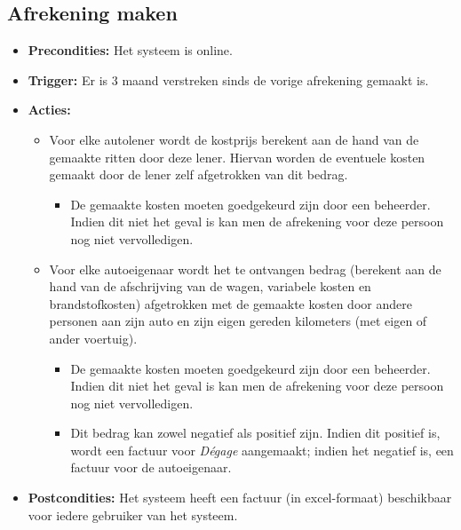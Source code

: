 \documentclass[]{article}
\begin{document}
\subsection{Afrekening maken}
\begin{itemize}
\item \textbf{Precondities:} Het systeem is online.
\item \textbf{Trigger:} Er is 3 maand verstreken sinds de vorige afrekening gemaakt is.
\item \textbf{Acties:} 
\begin{itemize}
	\item	Voor elke autolener wordt de kostprijs berekent aan de hand van de gemaakte ritten door deze lener. Hiervan worden de eventuele kosten gemaakt door de lener zelf afgetrokken van dit bedrag.
		\begin{itemize}
			\item De gemaakte kosten moeten goedgekeurd zijn door een beheerder. Indien dit niet het geval is kan men de afrekening voor deze persoon nog niet vervolledigen.
		\end{itemize}
	\item	Voor elke autoeigenaar wordt het te ontvangen bedrag (berekent aan de hand van de afschrijving van de wagen, variabele kosten en brandstofkosten) afgetrokken met de gemaakte kosten door andere personen aan zijn auto en zijn eigen gereden kilometers (met eigen of ander voertuig).
		\begin{itemize}
			\item De gemaakte kosten moeten goedgekeurd zijn door een beheerder. Indien dit niet het geval is kan men de afrekening voor deze persoon nog niet vervolledigen.
			\item Dit bedrag kan zowel negatief als positief zijn. Indien dit positief is, wordt een factuur voor \emph{D\'{e}gage} aangemaakt; indien het negatief is, een factuur voor de autoeigenaar.
		\end{itemize}
\end{itemize}
\item \textbf{Postcondities:} Het systeem heeft een factuur (in excel-formaat) beschikbaar voor iedere gebruiker van het systeem.
\end{itemize}
\end{document}
